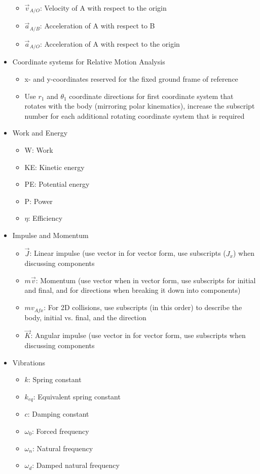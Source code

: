 \documentclass[a4paper]{article}
\begin{document}
\begin{itemize}
\begin{itemize}
			\item \(\vec{v}_{A/O}\): Velocity of A with respect to the origin
			\item \(\vec{a}_{A/B}\): Acceleration of A with respect to B
			\item \(\vec{a}_{A/O}\): Acceleration of A with respect to the origin
		\end{itemize}
	\item Coordinate systems for Relative Motion Analysis
		\begin{itemize}
			\item x- and y-coordinates reserved for the fixed ground frame of reference
			\item Use \(r_1\) and \(\theta_1\) coordinate directions for first coordinate system that rotates with the body (mirroring polar kinematics), increase the subscript number for each additional rotating coordinate system that is required
		\end{itemize}
	\item Work and Energy
		\begin{itemize}
			\item W: Work
			\item KE: Kinetic energy
			\item PE: Potential energy
			\item P: Power
			\item \(\eta\): Efficiency
		\end{itemize}
	\item Impulse and Momentum
		\begin{itemize}
			\item \(\vec{J}\): Linear impulse (use vector in for vector form, use subscripts (\(J_x\)) when discussing components
			\item \(m\vec{v}\): Momentum (use vector when in vector form, use subscripts for initial and final, and for directions when breaking it down into components)
			\item \(mv_{Afx}\): For 2D collisions, use subscripts (in this order) to describe the body, initial vs. final, and the direction
			\item \(\vec{K}\): Angular impulse (use vector in for vector form, use subscripts when discussing components
		\end{itemize}
	\item Vibrations
		\begin{itemize}
			\item \(k\): Spring constant
			\item \(k_{eq}\): Equivalent spring constant
			\item \(c\): Damping constant
			\item \(\omega_0\): Forced frequency
			\item \(\omega_n\): Natural frequency
			\item \(\omega_d\): Damped natural frequency
		\end{itemize}
\end{itemize}
\end{document}
